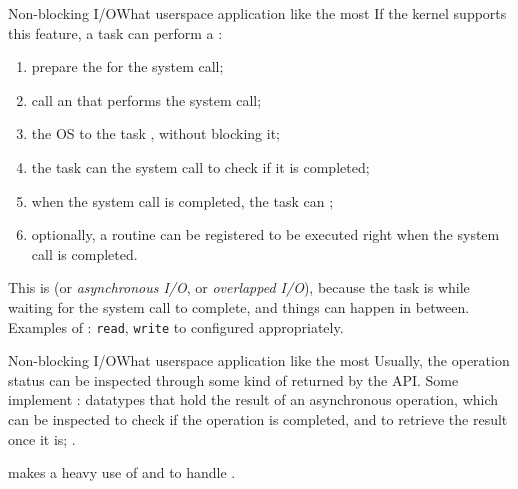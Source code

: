\begin{frame}{Non-blocking I/O}{What userspace application like the most}
  If the kernel supports this feature, a task can perform a :
  \begin{enumerate}
    \item prepare the  for the system call;
    \item call an  that performs the system call;
    \item the OS  to the task , without blocking it;
    \item the task can  the system call  to check if it is completed;
    \item when the system call is completed, the task can ;
    \item optionally, a  routine can be registered to be executed right when the system call is completed.
  \end{enumerate}
  This is  (or \emph{asynchronous I/O}, or \emph{overlapped I/O}), because the task is  while waiting for the system call to complete, and things can happen in between.
  \newline\newline
  Examples of : \texttt{read}, \texttt{write} to  configured appropriately.
\end{frame}
\begin{frame}{Non-blocking I/O}{What userspace application like the most}
  Usually, the operation status can be inspected through some kind of  returned by the API.
  \newline\newline
  Some  implement : datatypes that hold the result of an asynchronous operation, which can be inspected to check if the operation is completed, and to retrieve the result once it is; .
  \begin{alertblock}{}
    \centering
     makes a heavy use of  and  to handle .
  \end{alertblock}
\end{frame}
